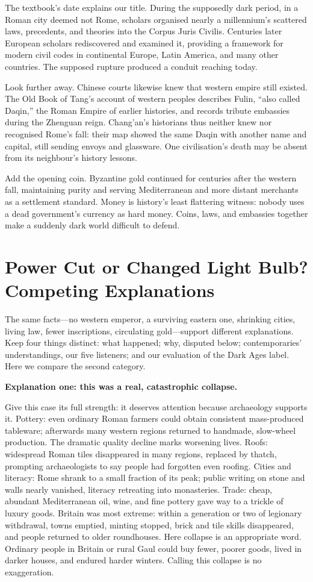 The textbook's date explains our title. During the supposedly dark period, in a Roman city deemed not Rome, scholars organised nearly a millennium's scattered laws, precedents, and theories into the Corpus Juris Civilis. Centuries later European scholars rediscovered and examined it, providing a framework for modern civil codes in continental Europe, Latin America, and many other countries. The supposed rupture produced a conduit reaching today.

Look further away. Chinese courts likewise knew that western empire still existed. The Old Book of Tang's account of western peoples describes Fulin, ``also called Daqin,'' the Roman Empire of earlier histories, and records tribute embassies during the Zhenguan reign. Chang'an's historians thus neither knew nor recognised Rome's fall: their map showed the same Daqin with another name and capital, still sending envoys and glassware. One civilisation's death may be absent from its neighbour's history lessons.

Add the opening coin. Byzantine gold continued for centuries after the western fall, maintaining purity and serving Mediterranean and more distant merchants as a settlement standard. Money is history's least flattering witness: nobody uses a dead government's currency as hard money. Coins, laws, and embassies together make a suddenly dark world difficult to defend.

\section[Power Cut or New Lamp?]{Power Cut or Changed Light Bulb? Competing Explanations}
The same facts---no western emperor, a surviving eastern one, shrinking cities, living law, fewer inscriptions, circulating gold---support different explanations. Keep four things distinct: what happened; why, disputed below; contemporaries' understandings, our five listeners; and our evaluation of the Dark Ages label. Here we compare the second category.

\textbf{Explanation one: this was a real, catastrophic collapse.}

Give this case its full strength: it deserves attention because archaeology supports it. Pottery: even ordinary Roman farmers could obtain consistent mass-produced tableware; afterwards many western regions returned to handmade, slow-wheel production. The dramatic quality decline marks worsening lives. Roofs: widespread Roman tiles disappeared in many regions, replaced by thatch, prompting archaeologists to say people had forgotten even roofing. Cities and literacy: Rome shrank to a small fraction of its peak; public writing on stone and walls nearly vanished, literacy retreating into monasteries. Trade: cheap, abundant Mediterranean oil, wine, and fine pottery gave way to a trickle of luxury goods. Britain was most extreme: within a generation or two of legionary withdrawal, towns emptied, minting stopped, brick and tile skills disappeared, and people returned to older roundhouses. Here collapse is an appropriate word. Ordinary people in Britain or rural Gaul could buy fewer, poorer goods, lived in darker houses, and endured harder winters. Calling this collapse is no exaggeration.

